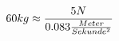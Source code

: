 \documentclass[preview]{standalone}
\begin{document}
\begin{align*}
{\special{dvisvgm:raw <g id='unique000'>}60kg \approx \frac{5N}{0.083 \frac{Meter}{Sekunde^{2}}}}\special{dvisvgm:raw </g>}
\end{align*}
\end{document}
